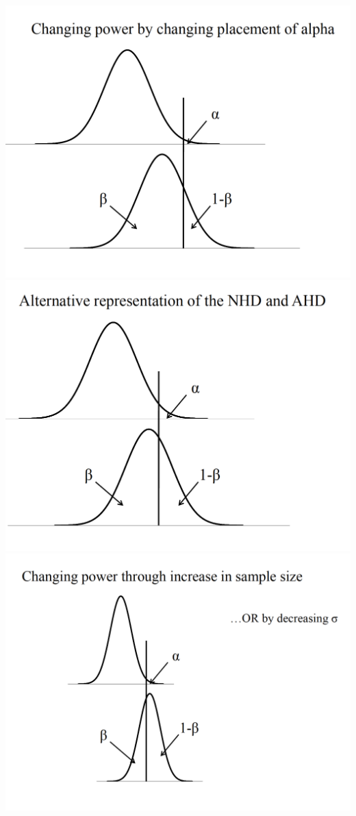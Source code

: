 \documentclass[]{book}
\theoremstyle{definition}
\theoremstyle{definition}
\theoremstyle{definition}
\theoremstyle{remark}
\begin{document}
\includegraphics{img/hickspower7.png}
\includegraphics{img/hickspower8.png}
\includegraphics{img/hickspower9.png}
\end{document}
